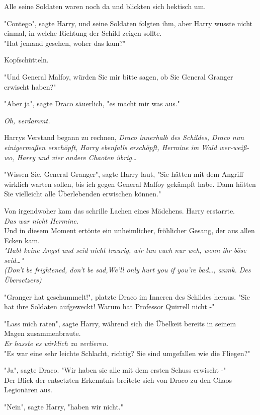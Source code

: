 {Alle seine Soldaten waren noch da und blickten sich hektisch um.

"Contego", sagte Harry, und seine Soldaten folgten ihm, aber Harry wusste nicht einmal, in welche Richtung der Schild zeigen sollte.\\ "Hat jemand gesehen, woher das kam?"

Kopfschütteln.

"Und General Malfoy, würden Sie mir bitte sagen, ob Sie General Granger erwischt haben?"

"Aber ja", sagte Draco säuerlich, "es macht mir was aus."

\emph{Oh, verdammt.}

Harrys Verstand begann zu rechnen, \emph{Draco innerhalb des Schildes, Draco nun} \emph{einigermaßen erschöpft, Harry ebenfalls erschöpft, Hermine im Wald wer-weiß-wo, Harry und vier andere Chaoten übrig…}

"Wissen Sie, General Granger", sagte Harry laut, "Sie hätten mit dem Angriff wirklich warten sollen, bis ich gegen General Malfoy gekämpft habe. Dann hätten Sie vielleicht alle Überlebenden erwischen können."

Von irgendwoher kam das schrille Lachen eines Mädchens. Harry erstarrte.\\ \emph{Das war nicht Hermine.}\\ Und in diesem Moment ertönte ein unheimlicher, fröhlicher Gesang, der aus allen Ecken kam.\\ \emph{"Habt keine Angst und seid nicht traurig, wir tun euch nur weh, wenn ihr böse seid…"}\\ \emph{(Don't be frightened, don't be sad,We'll only hurt you if you're bad…, anmk. Des Übersetzers)}

"Granger hat geschummelt!", platzte Draco im Inneren des Schildes heraus. "Sie hat ihre Soldaten aufgeweckt! Warum hat Professor Quirrell nicht -"

"Lass mich raten", sagte Harry, während sich die Übelkeit bereits in seinem Magen zusammenbraute.\\ \emph{Er hasste es wirklich zu verlieren.}\\ "Es war eine sehr leichte Schlacht, richtig? Sie sind umgefallen wie die Fliegen?"

"Ja", sagte Draco. "Wir haben sie alle mit dem ersten Schuss erwischt -"\\ Der Blick der entsetzten Erkenntnis breitete sich von Draco zu den Chaos-Legionären aus.

"Nein", sagte Harry, "haben wir nicht."

}
